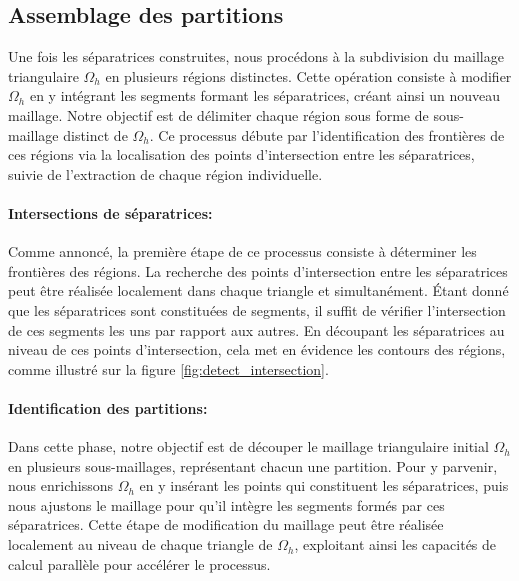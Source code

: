 \subsection{Assemblage des partitions}

Une fois les séparatrices construites, nous procédons à la subdivision du maillage triangulaire $\Omega_h$ en plusieurs régions distinctes. Cette opération consiste à modifier $\Omega_h$ en y intégrant les segments formant les séparatrices, créant ainsi un nouveau maillage. Notre objectif est de délimiter chaque région sous forme de sous-maillage distinct de $\Omega_h$. Ce processus débute par l'identification des frontières de ces régions via la localisation des points d'intersection entre les séparatrices, suivie de l'extraction de chaque région individuelle.

\paragraph{Intersections de séparatrices:}

Comme annoncé, la première étape de ce processus consiste à déterminer les frontières des régions. La recherche des points d'intersection entre les séparatrices peut être réalisée localement dans chaque triangle et simultanément. Étant donné que les séparatrices sont constituées de segments, il suffit de vérifier l'intersection de ces segments les uns par rapport aux autres. En découpant les séparatrices au niveau de ces points d'intersection, cela met en évidence les contours des régions, comme illustré sur la figure \ref{fig:detect_intersection}.

\paragraph{Identification des partitions:}
Dans cette phase, notre objectif est de découper le maillage triangulaire initial $\Omega_h$ en plusieurs sous-maillages, représentant chacun une partition. Pour y parvenir, nous enrichissons $\Omega_h$ en y insérant les points qui constituent les séparatrices, puis nous ajustons le maillage pour qu'il intègre les segments formés par ces séparatrices. Cette étape de modification du maillage peut être réalisée localement au niveau de chaque triangle de $\Omega_h$, exploitant ainsi les capacités de calcul parallèle pour accélérer le processus.


